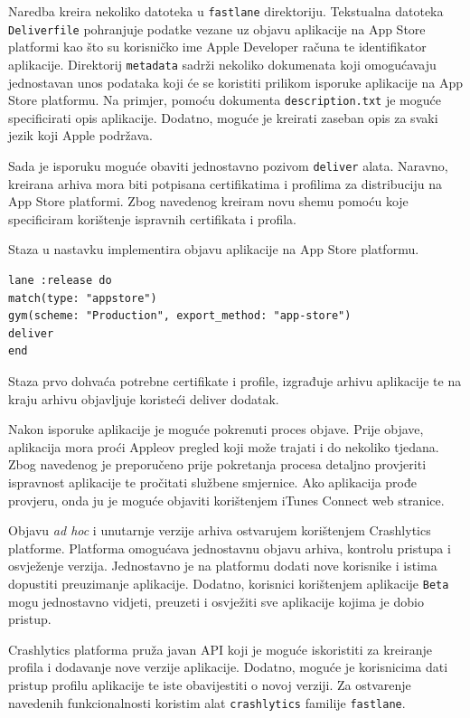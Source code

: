 \documentclass[times, utf8, diplomski, numeric]{fer}
\begin{document}
Naredba kreira nekoliko datoteka u \verb|fastlane| direktoriju. Tekstualna datoteka \verb|Deliverfile| pohranjuje podatke vezane uz objavu aplikacije na App Store platformi kao što su korisničko ime Apple Developer računa te identifikator aplikacije. Direktorij \verb|metadata| sadrži nekoliko dokumenata koji omogućavaju jednostavan unos podataka koji će se koristiti prilikom isporuke aplikacije na App Store platformu. Na primjer, pomoću dokumenta \verb|description.txt| je moguće specificirati opis aplikacije. Dodatno, moguće je kreirati zaseban opis za svaki jezik koji Apple podržava.

Sada je isporuku moguće obaviti jednostavno pozivom \verb|deliver| alata. Naravno, kreirana arhiva mora biti potpisana certifikatima i profilima za distribuciju na App Store platformi. Zbog navedenog kreiram novu shemu pomoću koje specificiram korištenje ispravnih certifikata i profila.

Staza u nastavku implementira objavu aplikacije na App Store platformu.

\begin{lstlisting}[caption=Isporuka na App Store platformu korištenjem dodatka deliver]
lane :release do
match(type: "appstore")
gym(scheme: "Production", export_method: "app-store")
deliver
end
\end{lstlisting}

Staza prvo dohvaća potrebne certifikate i profile, izgrađuje arhivu aplikacije te na kraju arhivu objavljuje koristeći deliver dodatak.

Nakon isporuke aplikacije je moguće pokrenuti proces objave. Prije objave, aplikacija mora proći Appleov pregled koji može trajati i do nekoliko tjedana. Zbog navedenog je preporučeno prije pokretanja procesa detaljno provjeriti ispravnost aplikacije te pročitati službene smjernice. Ako aplikacija prođe provjeru, onda ju je moguće objaviti korištenjem iTunes Connect web stranice.




Objavu \textit{ad hoc} i unutarnje verzije arhiva ostvarujem korištenjem Crashlytics platforme. Platforma omogućava jednostavnu objavu arhiva, kontrolu pristupa i osvježenje verzija. Jednostavno je na platformu dodati nove korisnike i istima dopustiti preuzimanje aplikacije. Dodatno, korisnici korištenjem aplikacije \verb|Beta| mogu jednostavno vidjeti, preuzeti i osvježiti sve aplikacije kojima je dobio pristup.

Crashlytics platforma pruža javan API koji je moguće iskoristiti za kreiranje profila i dodavanje nove verzije aplikacije. Dodatno, moguće je korisnicima dati pristup profilu aplikacije te iste obavijestiti o novoj verziji. Za ostvarenje navedenih funkcionalnosti koristim alat \verb|crashlytics| familije \verb|fastlane|.
\end{document}
